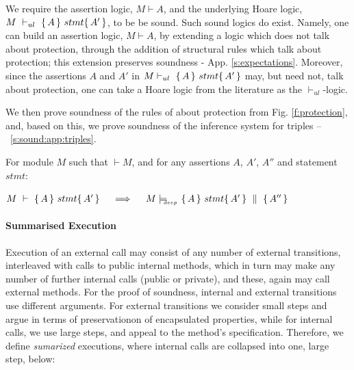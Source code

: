 \label{sect:prove:triples:sound}
We require the assertion logic,  $M\vdash A$, and  the  underlying Hoare logic,  $M\ \vdash_{ul}\  \triple A {stmt} {A'}$,   to be be  sound. 
Such  sound logics do exist.
Namely, one can build an assertion logic, $M\vdash A$, by extending a logic which does not talk about protection, through the addition of structural rules which talk about protection; this extension preserves soundness - \cf  App. \ref{s:expectations}. 
Moreover,  since the assertions $A$ and $A'$ in $M \vdash_{ul}\   \{\, A \, \}\ stmt \{\, A' \, \}$ may, but need not, talk about protection, 
one can take a Hoare logic from the literature as the $ \vdash_{ul}$-logic.

We then prove   soundness of the rules of about protection from Fig. \ref{f:protection}, and, based on this, 
we prove soundness of the inference system for triples  -- \cf \A\ \ref{s:sound:app:triples}.

 

\begin{Theorem}
\label{l:triples:sound}
For module  $M$   such that  $\vdash M$, and for any assertions $A$,  $A'$, $A''$ and statement  $stmt$:
\begin{center}
$M\ \vdash\  \triple A {stmt} {A'}  \ \ \ \  \Longrightarrow  \ \ \ \ \satisfiesD {M} {\quadruple {A} {stmt} {A'} {A''}}$
\end{center}
\end{Theorem}
 

\paragraph{Summarised Execution}
\label{s:summaized}
Execution of an external call may consist of any number of external
transitions, interleaved with calls to public internal methods, which in
turn may make any number of further internal calls (public or private),  %
and these, again may call external methods.
For the   proof of soundness,  internal and external transitions use different arguments.
 For  external transitions we consider small steps  and  argue in terms of  preservationon of  encapsulated properties,
while for internal calls, we use large steps, and appeal to the method's specification.
Therefore, we define  \emph{sumarized} executions, where  internal calls are collapsed into one, large step, \eg below:
  

\label{sect:termExecs}


